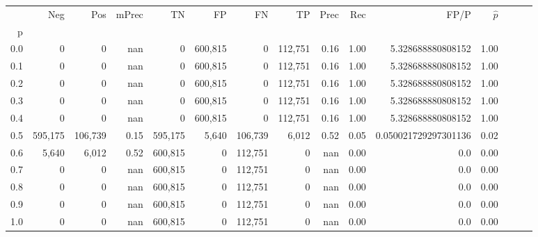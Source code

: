 \begin{tabular}{rrrrrrrrrrrrrrr}
\toprule
{} &      Neg &      Pos & mPrec &       TN &       FP &       FN &       TP &  Prec &   Rec &                  FP/P & $\hat{p}$ \\
p   &          &          &       &          &          &          &          &       &       &                       &           \\
\midrule
0.0 &        0 &        0 &   nan &        0 &  600,815 &        0 &  112,751 &  0.16 &  1.00 &     5.328688880808152 &      1.00 \\
0.1 &        0 &        0 &   nan &        0 &  600,815 &        0 &  112,751 &  0.16 &  1.00 &     5.328688880808152 &      1.00 \\
0.2 &        0 &        0 &   nan &        0 &  600,815 &        0 &  112,751 &  0.16 &  1.00 &     5.328688880808152 &      1.00 \\
0.3 &        0 &        0 &   nan &        0 &  600,815 &        0 &  112,751 &  0.16 &  1.00 &     5.328688880808152 &      1.00 \\
0.4 &        0 &        0 &   nan &        0 &  600,815 &        0 &  112,751 &  0.16 &  1.00 &     5.328688880808152 &      1.00 \\
0.5 &  595,175 &  106,739 &  0.15 &  595,175 &    5,640 &  106,739 &    6,012 &  0.52 &  0.05 &  0.050021729297301136 &      0.02 \\
0.6 &    5,640 &    6,012 &  0.52 &  600,815 &        0 &  112,751 &        0 &   nan &  0.00 &                   0.0 &      0.00 \\
0.7 &        0 &        0 &   nan &  600,815 &        0 &  112,751 &        0 &   nan &  0.00 &                   0.0 &      0.00 \\
0.8 &        0 &        0 &   nan &  600,815 &        0 &  112,751 &        0 &   nan &  0.00 &                   0.0 &      0.00 \\
0.9 &        0 &        0 &   nan &  600,815 &        0 &  112,751 &        0 &   nan &  0.00 &                   0.0 &      0.00 \\
1.0 &        0 &        0 &   nan &  600,815 &        0 &  112,751 &        0 &   nan &  0.00 &                   0.0 &      0.00 \\
\bottomrule
\end{tabular}
